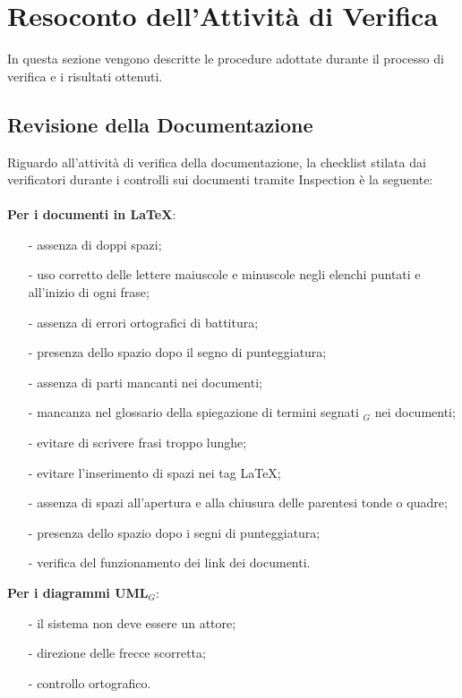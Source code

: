 \section{Resoconto dell'Attività di Verifica}
In questa sezione vengono descritte le procedure adottate durante il processo di
verifica e i risultati ottenuti.
\subsection{Revisione della Documentazione}
Riguardo all'attività di verifica della documentazione, la checklist stilata dai verificatori durante i controlli sui documenti tramite Inspection è la seguente:\\ \\
\textbf{Per i documenti in \LaTeX}:
\begin{itemize}
	\item[-] assenza di doppi spazi;
	\item[-] uso corretto delle lettere maiuscole e minuscole negli elenchi puntati e all'inizio di ogni frase;
	\item[-] assenza di errori ortografici di battitura;
	\item[-] presenza dello spazio dopo il segno di punteggiatura; 
	\item[-] assenza di parti mancanti nei documenti;
	\item[-] mancanza nel glossario della spiegazione di termini segnati $_G$ nei documenti;
	\item[-] evitare di scrivere frasi troppo lunghe;
	\item[-] evitare l'inserimento di spazi nei tag \LaTeX{};
	\item[-] assenza di spazi all'apertura e alla chiusura delle parentesi tonde o quadre;
	\item[-] presenza dello spazio dopo i segni di punteggiatura; 
	\item[-] verifica del funzionamento dei link dei documenti.
\end{itemize}
\textbf{Per i diagrammi UML$_G$}:
\begin{itemize}
	\item[-] il sistema non deve essere un attore;
	\item[-] direzione delle frecce scorretta;
	\item[-] controllo ortografico.
\end{itemize}
